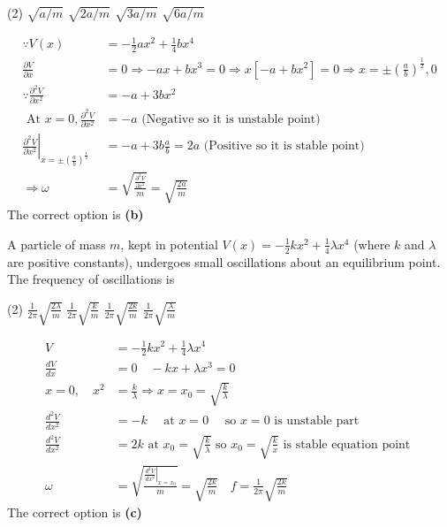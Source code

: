 \begin{enumerate}
	\begin{tasks}(2)
		\task[\textbf{A.}] $\sqrt{a / m}$
		\task[\textbf{B.}]$\sqrt{2 a / m}$
		\task[\textbf{C.}]$\sqrt{3 a / m}$
		\task[\textbf{D.}]$\sqrt{6 a / m}$
	\end{tasks}
	\begin{answer}
		\begin{align*}
		\because V(x)&=-\frac{1}{2} a x^{2}+\frac{1}{4} b x^{4}	\\
		\frac{\partial V}{\partial x}&=0 \Rightarrow-a x+b x^{3}=0 \Rightarrow x\left[-a+b x^{2}\right]=0 \Rightarrow x=\pm\left(\frac{a}{b}\right)^{\frac{1}{2}}, 0\\
		\because \frac{\partial^{2} V}{\partial x^{2}}&=-a+3 b x^{2}\\
		\text { At } x=0, \frac{\partial^{2} V}{\partial x^{2}}&=-a \text { (Negative so it is unstable point) }\\
		\left.\frac{\partial^{2} V}{\partial x^{2}}\right|_{x=\pm\left(\frac{a}{b}\right)^{\frac{1}{2}}}&=-a+3 b \frac{a}{b}=2 a \text { (Positive so it is stable point) }\\
		\Rightarrow \omega&=\sqrt{\frac{\frac{\partial^{2} V}{\partial x^{2}}}{m}}=\sqrt{\frac{2 a}{m}}
		\end{align*}
		The correct option is \textbf{(b)}
	\end{answer}
	\begin{minipage}{\textwidth}
		\item A particle of mass $m$, kept in potential $V(x)=-\frac{1}{2} k x^{2}+\frac{1}{4} \lambda x^{4}$ (where $k$ and $\lambda$ are positive constants), undergoes small oscillations about an equilibrium point. The frequency of oscillations is
	\end{minipage}
	\begin{tasks}(2)
		\task[\textbf{A.}] $\frac{1}{2 \pi} \sqrt{\frac{2 \lambda}{m}}$
		\task[\textbf{B.}]$\frac{1}{2 \pi} \sqrt{\frac{k}{m}}$
		\task[\textbf{C.}]$\frac{1}{2 \pi} \sqrt{\frac{2 k}{m}}$
		\task[\textbf{D.}]$\frac{1}{2 \pi} \sqrt{\frac{\lambda}{m}}$
	\end{tasks}
	\begin{answer}
		\begin{align*}
		V&=-\frac{1}{2} k x^{2}+\frac{1}{4} \lambda x^{4}\\
		\frac{d V}{d x}&=0 \quad-k x+\lambda x^{3}=0\\
		x=0, \quad x^{2}&=\frac{k}{\lambda} \Rightarrow x=x_{0}=\sqrt{\frac{k}{\lambda}}\\
		\frac{d^{2} V}{d x^{2}}&=-k \quad \text { at } x=0 \quad \text { so } x=0 \text { is unstable part }\\
		\frac{d^{2} V}{d x^{2}}&=2 k \text { at } x_{0}=\sqrt{\frac{k}{\lambda}} \text { so } x_{0}=\sqrt{\frac{k}{x}} \text { is stable equation point }\\
		\omega&=\sqrt{\frac{\left.\frac{d^{2} V}{d x^{2}}\right|_{x=x_{0}}}{m}}=\sqrt{\frac{2 k}{m}} \quad f=\frac{1}{2 \pi} \sqrt{\frac{2 k}{m}}
		\end{align*}
		The correct option is \textbf{(c)}
	\end{answer}
\end{enumerate}
